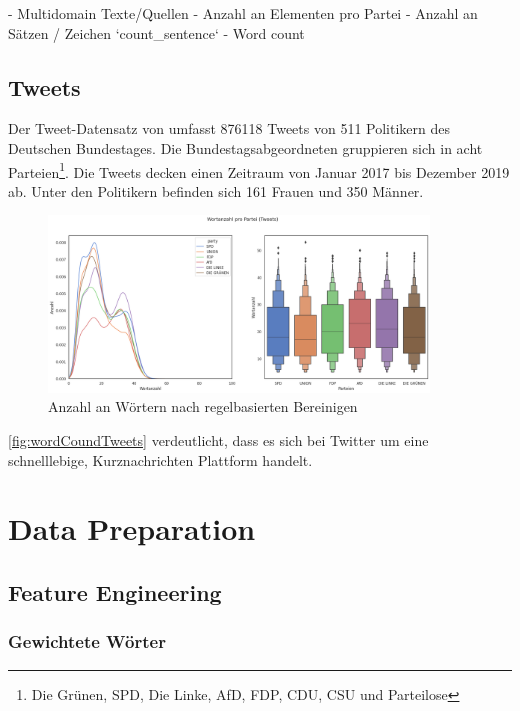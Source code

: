 - Multidomain Texte/Quellen
- Anzahl an Elementen pro Partei
- Anzahl an Sätzen / Zeichen `count\_sentence`
- Word count

\subsection{Tweets}

Der Tweet-Datensatz von \textcite{saltzer_finding_2022} umfasst \num{876118} Tweets von \num{511} Politikern des Deutschen Bundestages. Die Bundestagsabgeordneten gruppieren sich in acht Parteien\footnote{Die Grünen, \ac{SPD}, Die Linke, \ac{AfD}, \ac{FDP}, \ac{CDU}, \ac{CSU} und Parteilose}. Die Tweets decken einen Zeitraum von Januar \num{2017} bis Dezember \num{2019} ab. Unter den Politikern befinden sich \num{161} Frauen und \num{350} Männer.


\begin{figure}[H]
    \centering
    \includegraphics[width=0.9\textwidth]{data/images/tweets_word_count.png}
    \caption{Anzahl an Wörtern nach regelbasierten Bereinigen} \label{fig:wordCoundTweets}
\end{figure}


\autoref{fig:wordCoundTweets} verdeutlicht, dass es sich bei Twitter um eine schnelllebige, Kurznachrichten Plattform handelt. 

\section{Data Preparation} \label{sec:dataPreparation}

\subsection{Feature Engineering} \label{subsec:featureEngineering}

\subsubsection{Gewichtete Wörter}

